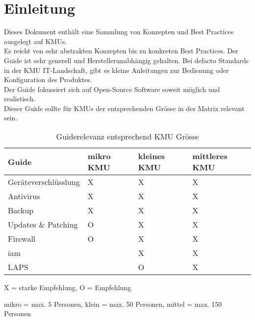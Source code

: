 \chapter{Einleitung}
Dieses Dokument enthält eine Sammlung von Konzepten und Best Practices ausgelegt auf KMUs.\\

Es reicht von sehr abstrakten Konzepten bis zu konkreten Best Practices.
Der Guide ist sehr generell und Herstellerunabhängig gehalten.
Bei defacto Standards in der KMU IT-Landschaft, gibt es kleine Anleitungen zur Bedienung oder Konfiguration des Produktes.\\

Der Guide fokussiert sich auf Open-Source Software soweit möglich und realistisch.\\

Dieser Guide sollte für KMUs der entsprechenden Grösse in der Matrix relevant sein.

\begin{table}[H]
    \begin{center}
        \begin{tabular}{l|l|l|l}
            Guide                & mikro KMU & kleines KMU & mittleres KMU\\
            \hline
            Geräteverschlüsslung & X         & X             & X\\
            Antivirus            & X         & X             & X\\
            Backup               & X         & X             & X\\
            Updates \& Patching  & O         & X             & X\\
            Firewall             & O         & X             & X\\
            \acrshort{iam}       &           & X             & X\\
            LAPS                 &           & O             & X\\
        \end{tabular}
        \caption*{X = starke Empfehlung, O = Empfehlung}
        \vspace{-3mm}
        \caption*{mikro = max. 5 Personen, klein = max. 50 Personen, mittel = max. 150 Personen}
    \end{center}
    \caption{Guiderelevanz entsprechend KMU Grösse}
\end{table}